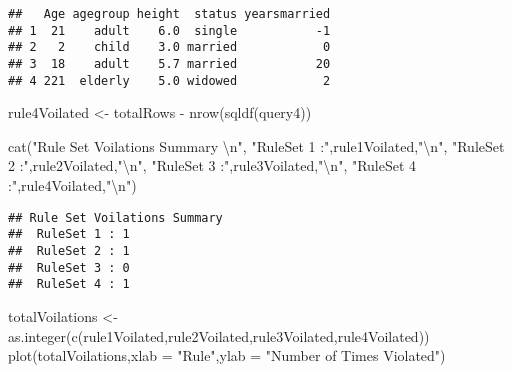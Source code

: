 \documentclass[
]{article}
\newenvironment{Shaded}{\begin{snugshade}}{\end{snugshade}}
\newcommand{\AttributeTok}[1]{\textcolor[rgb]{0.77,0.63,0.00}{#1}}
\newcommand{\FunctionTok}[1]{\textcolor[rgb]{0.00,0.00,0.00}{#1}}
\newcommand{\NormalTok}[1]{#1}
\newcommand{\OtherTok}[1]{\textcolor[rgb]{0.56,0.35,0.01}{#1}}
\newcommand{\SpecialCharTok}[1]{\textcolor[rgb]{0.00,0.00,0.00}{#1}}
\newcommand{\StringTok}[1]{\textcolor[rgb]{0.31,0.60,0.02}{#1}}
\begin{document}
\begin{verbatim}
##   Age agegroup height  status yearsmarried
## 1  21    adult    6.0  single           -1
## 2   2    child    3.0 married            0
## 3  18    adult    5.7 married           20
## 4 221  elderly    5.0 widowed            2
\end{verbatim}

\begin{Shaded}
\begin{Highlighting}[]
\NormalTok{rule4Voilated }\OtherTok{\textless{}{-}}\NormalTok{ totalRows }\SpecialCharTok{{-}} \FunctionTok{nrow}\NormalTok{(}\FunctionTok{sqldf}\NormalTok{(query4))}
\end{Highlighting}
\end{Shaded}

\begin{Shaded}
\begin{Highlighting}[]
\FunctionTok{cat}\NormalTok{(}\StringTok{"Rule Set Voilations Summary }\SpecialCharTok{\textbackslash{}n}\StringTok{"}\NormalTok{,}
    \StringTok{"RuleSet 1 :"}\NormalTok{,rule1Voilated,}\StringTok{"}\SpecialCharTok{\textbackslash{}n}\StringTok{"}\NormalTok{,}
    \StringTok{"RuleSet 2 :"}\NormalTok{,rule2Voilated,}\StringTok{"}\SpecialCharTok{\textbackslash{}n}\StringTok{"}\NormalTok{,}
    \StringTok{"RuleSet 3 :"}\NormalTok{,rule3Voilated,}\StringTok{"}\SpecialCharTok{\textbackslash{}n}\StringTok{"}\NormalTok{,}
    \StringTok{"RuleSet 4 :"}\NormalTok{,rule4Voilated,}\StringTok{"}\SpecialCharTok{\textbackslash{}n}\StringTok{"}\NormalTok{)}
\end{Highlighting}
\end{Shaded}

\begin{verbatim}
## Rule Set Voilations Summary 
##  RuleSet 1 : 1 
##  RuleSet 2 : 1 
##  RuleSet 3 : 0 
##  RuleSet 4 : 1
\end{verbatim}

\begin{Shaded}
\begin{Highlighting}[]
\NormalTok{totalVoilations }\OtherTok{\textless{}{-}} \FunctionTok{as.integer}\NormalTok{(}\FunctionTok{c}\NormalTok{(rule1Voilated,rule2Voilated,rule3Voilated,rule4Voilated))}
\FunctionTok{plot}\NormalTok{(totalVoilations,}\AttributeTok{xlab =} \StringTok{"Rule"}\NormalTok{,}\AttributeTok{ylab =} \StringTok{"Number of Times Violated"}\NormalTok{)}
\end{Highlighting}
\end{Shaded}
\end{document}
